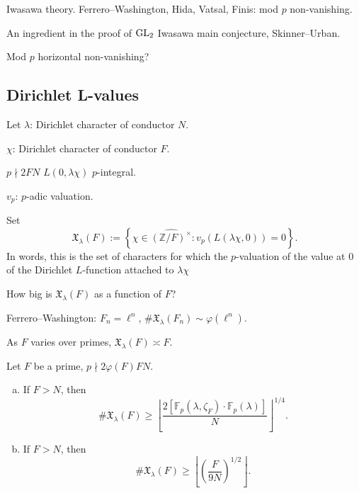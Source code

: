 \documentclass[reqno]{amsart} 
\begin{document}
Iwasawa theory.  Ferrero--Washington, Hida, Vatsal, Finis: mod $p$ non-vanishing.

An ingredient in the proof of $\operatorname{GL}_2$ Iwasawa main conjecture, Skinner--Urban.

Mod $p$ horizontal non-vanishing?

\subsection{Dirichlet L-values}\label{sec:cnfhlpuw9d}
Let $\lambda$: Dirichlet character of conductor $N$.

$\chi$: Dirichlet character of conductor $F$.

$p \nmid 2 F N$ $L(0, \lambda \chi)$ $p$-integral.

$v_p$: $p$-adic valuation.

Set
\begin{equation*}
\mathfrak{X}_\lambda(F) := \left\{ \chi \in \widehat{(\mathbb{Z} / F)^\times } : v_p \left( L(\lambda \chi, 0) \right) = 0 \right\}.
\end{equation*}
In words, this is the set of characters for which the $p$-valuation of the value at $0$ of the Dirichlet $L$-function attached to $\lambda \chi$

\begin{question}\label{question:cnfg5j4tbm}
  How big is $\mathfrak{X}_\lambda(F) $ as a function of $F$?
\end{question}

Ferrero--Washington: $F_n = \ell^n$, $\# \mathfrak{X}_\lambda(F_n) \sim \varphi(\ell^n)$.

As $F$ varies over primes, $\mathfrak{X}_\lambda(F) \asymp F$.

\begin{theorem}[Sun--B]\label{theorem:cnfg5jyjlh}
  Let $F$ be a prime, $p \nmid 2 \varphi(F) F N$.
  \begin{enumerate}[(a)]
  \item\label{enumerate:cnekzumaui} If $F > N$, then
    \begin{equation*}
      \# \mathfrak{X}_\lambda(F) \geq
      \left\lfloor
        \frac{2 [\mathbb{F}_p(\lambda, \zeta_F ) \cdot \mathbb{F}_p(\lambda) ]}{N}
      \right\rfloor^{1/4}.
    \end{equation*}
  \item\label{enumerate:cnekzumb90} If $F > N$, then
    \begin{equation*}
      \# \mathfrak{X}_\lambda(F) \geq
      \left\lfloor
        \left( \frac{F}{9 N} \right)^{1/2}
      \right\rfloor.
    \end{equation*}
  \end{enumerate}
\end{theorem}
\end{document}
